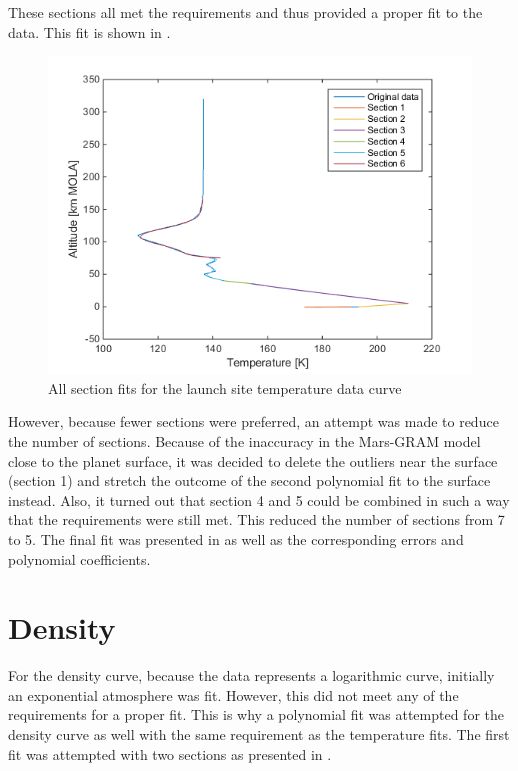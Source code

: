 \noindent
These sections all met the requirements and thus provided a proper fit to the data. This fit is shown in .

\begin{figure}[H]
\centering
\includegraphics[width=0.6 \textwidth]{figures/software/completePolyFitTempSplit7.png}
\caption{All section fits for the launch site temperature data curve}
\label{fig:completePolyFitTempSplit7}
\end{figure}

\noindent
However, because fewer sections were preferred, an attempt was made to reduce the number of sections. Because of the inaccuracy in the Mars-\ac{GRAM} model close to the planet surface, it was decided to delete the outliers near the surface (section 1) and stretch the outcome of the second polynomial fit to the surface instead. Also, it turned out that section 4 and 5 could be combined in such a way that the requirements were still met. This reduced the number of sections from 7 to 5. The final fit was presented in  as well as the corresponding errors and polynomial coefficients.                                                                                      




\section{Density}
\label{appsec:denFit}
For the density curve, because the data represents a logarithmic curve, initially an exponential atmosphere was fit. However, this did not meet any of the requirements for a proper fit. This is why a polynomial fit was attempted for the density curve as well with the same requirement as the temperature fits. The first fit was attempted with two sections as presented in . 

